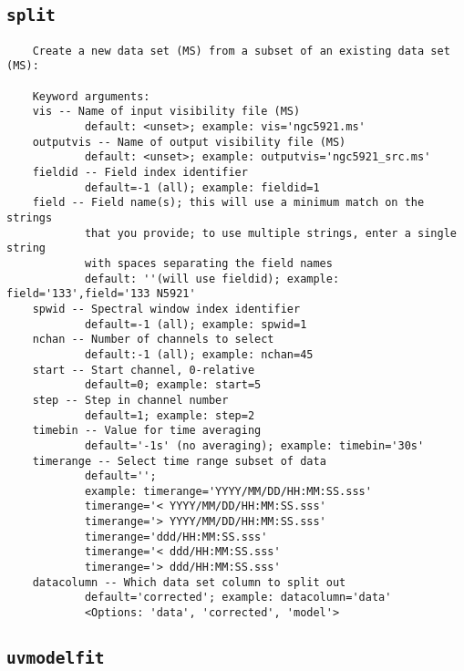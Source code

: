 \subsection{{\tt split}}
\label{section:tasks.split}

\small
\begin{verbatim}
    Create a new data set (MS) from a subset of an existing data set (MS):
    
    Keyword arguments:
    vis -- Name of input visibility file (MS)
            default: <unset>; example: vis='ngc5921.ms'
    outputvis -- Name of output visibility file (MS)
            default: <unset>; example: outputvis='ngc5921_src.ms'
    fieldid -- Field index identifier
            default=-1 (all); example: fieldid=1
    field -- Field name(s); this will use a minimum match on the strings
            that you provide; to use multiple strings, enter a single string
            with spaces separating the field names
            default: ''(will use fieldid); example: field='133',field='133 N5921'
    spwid -- Spectral window index identifier
            default=-1 (all); example: spwid=1
    nchan -- Number of channels to select
            default:-1 (all); example: nchan=45
    start -- Start channel, 0-relative
            default=0; example: start=5
    step -- Step in channel number
            default=1; example: step=2      
    timebin -- Value for time averaging
            default='-1s' (no averaging); example: timebin='30s'
    timerange -- Select time range subset of data
            default=''; 
            example: timerange='YYYY/MM/DD/HH:MM:SS.sss'
            timerange='< YYYY/MM/DD/HH:MM:SS.sss'
            timerange='> YYYY/MM/DD/HH:MM:SS.sss'
            timerange='ddd/HH:MM:SS.sss'
            timerange='< ddd/HH:MM:SS.sss'
            timerange='> ddd/HH:MM:SS.sss'
    datacolumn -- Which data set column to split out
            default='corrected'; example: datacolumn='data'
            <Options: 'data', 'corrected', 'model'>
\end{verbatim}
\normalsize


\subsection{{\tt uvmodelfit}}
\label{section:tasks.uvmodelfit}

